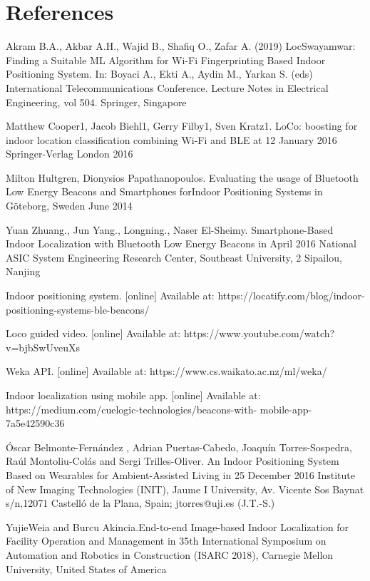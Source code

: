 \documentclass{article}
\begin{document}
\section{References}
\begin{thebibliography}{9}

Akram B.A., Akbar A.H., Wajid B., Shafiq O., Zafar A. (2019) LocSwayamwar: Finding a Suitable ML Algorithm for
 Wi-Fi Fingerprinting Based Indoor Positioning System. In: Boyaci A., Ekti A., Aydin M., Yarkan S. (eds) 
International Telecommunications Conference. Lecture Notes in Electrical Engineering, vol 504. Springer, Singapore

Matthew Cooper1, Jacob Biehl1, Gerry Filby1, Sven Kratz1. LoCo: boosting for indoor location classification combining Wi-Fi and BLE at 12 January 2016 Springer-Verlag London 2016

Milton Hultgren, Dionysios Papathanopoulos. Evaluating the usage of Bluetooth Low Energy Beacons and Smartphones forIndoor Positioning Systems in Göteborg, Sweden June 2014


Yuan Zhuang., Jun Yang., Longning., Naser El-Sheimy. Smartphone-Based Indoor Localization with
Bluetooth Low Energy Beacons in April 2016 National ASIC System Engineering Research Center, Southeast University, 2 Sipailou, Nanjing


Indoor positioning system. [online] Available at: https://locatify.com/blog/indoor-positioning-systems-ble-beacons/

Loco guided video. [online] Available at: https://www.youtube.com/watch?v=bjbSwUveuXs


Weka API. [online] Available at: https://www.cs.waikato.ac.nz/ml/weka/



 Indoor localization using mobile app. 
[online] Available at: https://medium.com/cuelogic-technologies/beacons-with-
mobile-app-7a5e42590c36

Óscar Belmonte-Fernández , Adrian Puertas-Cabedo, Joaquín Torres-Sospedra,
Raúl Montoliu-Colás and Sergi Trilles-Oliver. An Indoor Positioning System Based on Wearables
for Ambient-Assisted Living in 25 December 2016 Institute of New Imaging Technologies (INIT), Jaume I University, Av. Vicente Sos Baynat s/n,12071 Castelló de la Plana, Spain; jtorres@uji.es (J.T.-S.)

YujieWeia and Burcu Akincia.End-to-end Image-based Indoor Localization for Facility
Operation and Management in 35th International Symposium on Automation and Robotics in Construction (ISARC 2018), Carnegie Mellon University, United States of America


\end{thebibliography}
\end{document}
